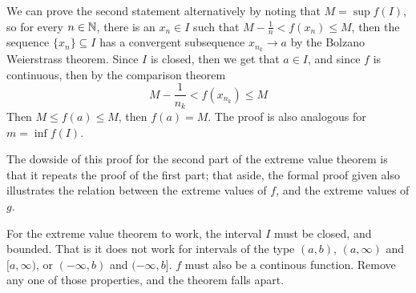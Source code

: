 We can prove the second statement alternatively by noting that $M=\sup{f(I)}$, 
so for every  $n \in \mathbb{N}$, there is an  $x_n \in I$ such that $M-\frac{1}{n}<f(x_n)
\leq M$, then the sequence $\{x_n\} \subseteq I$ has a convergent subsequence $x_{n_k} \rightarrow a$ by 
the Bolzano Weierstrass theorem. Since $I$ is closed, then we get that  $a \in I$, 
and since $f$ is continuous, then by the comparison theorem
    \begin{equation*}
        M-\frac{1}{n_k}<f(x_{n_k}) \leq M
    \end{equation*}
Then $M \leq f(a) \leq M$, then $f(a)=M$. The proof is also analogous for $m=\inf{f(I)}$.

The dowside of this proof for the second part of the extreme value theorem is that 
it repeats the proof of the first part; that aside, the formal proof given also 
illustrates the relation between the extreme values of $f$, and the extreme values 
of $g$.

For the extreme value theorem to work, the interval $I$ must be closed, and 
bounded. That is it does not work for intervals of the type  $(a,b)$, $(a, \infty)$ and 
$[a,\infty)$, or  $(-\infty, b)$ and  $(-\infty,b]$. $f$ must also be a continous 
function. Remove any one of those properties, and the theorem falls apart.
